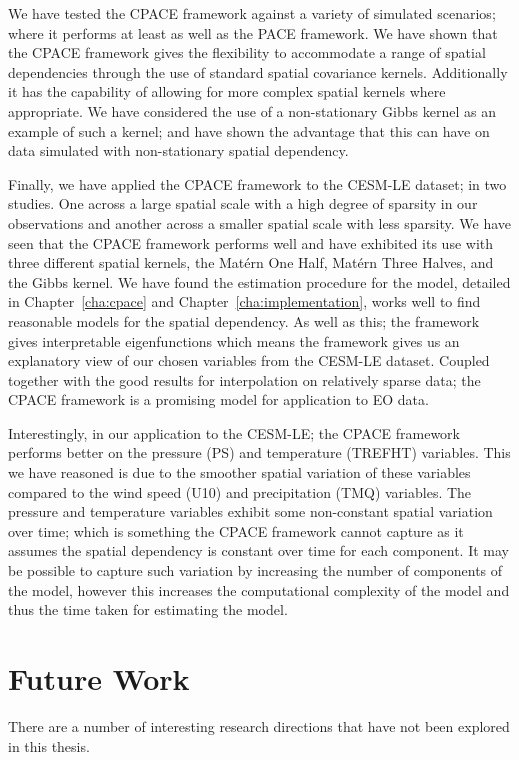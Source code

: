 We have tested the CPACE framework against a variety of simulated scenarios; where it performs at least as well as the PACE framework.
We have shown that the CPACE framework gives the flexibility to accommodate a range of spatial dependencies through the use of standard spatial covariance kernels.
Additionally it has the capability of allowing for more complex spatial kernels where appropriate.
We have considered the use of a non-stationary Gibbs kernel as an example of such a kernel; and have shown the advantage that this can have on data simulated with non-stationary spatial dependency.

Finally, we have applied the CPACE framework to the CESM-LE dataset; in two studies.
One across a large spatial scale with a high degree of sparsity in our observations and another across a smaller spatial scale with less sparsity.
We have seen that the CPACE framework performs well and have exhibited its use with three different spatial kernels, the Mat\'ern One Half, Mat\'ern Three Halves, and the Gibbs kernel.
We have found the estimation procedure for the model, detailed in Chapter~\ref{cha:cpace} and Chapter~\ref{cha:implementation}, works well to find reasonable models for the spatial dependency. 
As well as this; the framework gives interpretable eigenfunctions which means the framework gives us an explanatory view of our chosen variables from the CESM-LE dataset.
Coupled together with the good results for interpolation on relatively sparse data; the CPACE framework is a promising model for application to EO data.

Interestingly, in our application to the CESM-LE; the CPACE framework performs better on the pressure (PS) and temperature (TREFHT) variables.
This we have reasoned is due to the smoother spatial variation of these variables compared to the wind speed (U10) and precipitation (TMQ) variables.
The pressure and temperature variables exhibit some non-constant spatial variation over time; which is something the CPACE framework cannot capture as it assumes the spatial dependency is constant over time for each component.
It may be possible to capture such variation by increasing the number of components of the model, however this increases the computational complexity of the model and thus the time taken for estimating the model. 

\section{Future Work\label{sec:future_work}}
There are a number of interesting research directions that have not been explored in this thesis.

